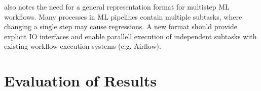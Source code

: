 \cite{Chen2020} also notes the need for a general representation format for multistep ML workflows.
Many processes in ML pipelines contain multiple subtasks, where changing a single step may cause regressions.
A new format should provide explicit IO interfaces and enable parallell execution of independent subtasks with existing workflow execution systems (e.g. Airflow).

\section{Evaluation of Results}